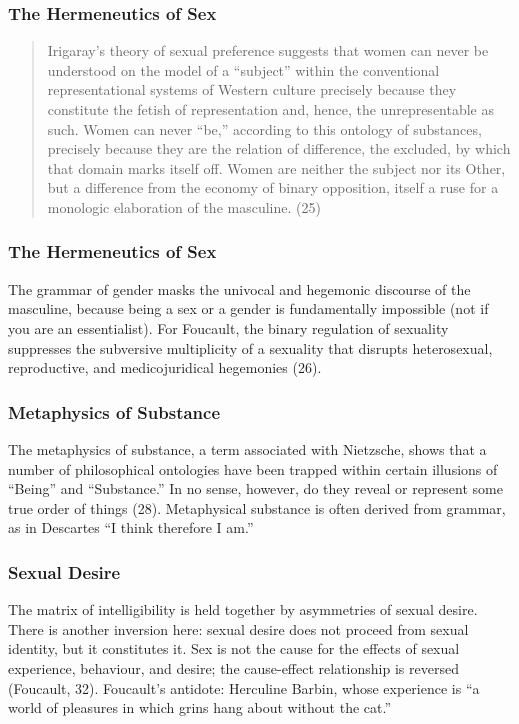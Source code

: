 \documentclass[xcolor=dvipsnames]{beamer}
\begin{document}
\begin{frame}
  \frametitle{The Hermeneutics of Sex}
  \begin{quote}
    Irigaray's theory of sexual preference suggests that women can
    never be understood on the model of a ``subject'' within the
    conventional representational systems of  Western culture
    precisely because they constitute the fetish of representation
    and, hence, the unrepresentable as such. Women can never ``be,''
    according to this ontology of substances, precisely because they
    are the relation of difference, the excluded, by which that domain
    marks itself off. Women are neither the subject nor its Other, but
    a difference from the economy of binary opposition, itself a ruse
    for a monologic elaboration of the masculine. (25)
  \end{quote}
\end{frame}

\begin{frame}
  \frametitle{The Hermeneutics of Sex}
  The grammar of gender masks the univocal and hegemonic discourse of
  the masculine, because being a sex or a gender is fundamentally
  impossible (not if you are an essentialist). For Foucault, the
  binary regulation of sexuality suppresses the subversive
  multiplicity of a sexuality that disrupts heterosexual,
  reproductive, and medicojuridical hegemonies (26).
\end{frame}

\begin{frame}
  \frametitle{Metaphysics of Substance}
The metaphysics of substance, a term associated with Nietzsche, shows
that a number of philosophical ontologies have been trapped within
certain illusions of ``Being'' and ``Substance.'' In no sense,
however, do they reveal or represent some true order of things (28).
Metaphysical substance is often derived from grammar, as in Descartes
``I think therefore I am.''  
\end{frame}

\begin{frame}
  \frametitle{Sexual Desire}
  The matrix of intelligibility is held together by asymmetries of
  sexual desire. There is another inversion here: sexual desire does
  not proceed from sexual identity, but it constitutes it. Sex is not
  the cause for the effects of sexual experience, behaviour, and
  desire; the cause-effect relationship is reversed (Foucault, 32).
  Foucault's antidote: Herculine Barbin, whose experience is ``a world
  of pleasures in which grins hang about without the cat.''
\end{frame}
\end{document}
